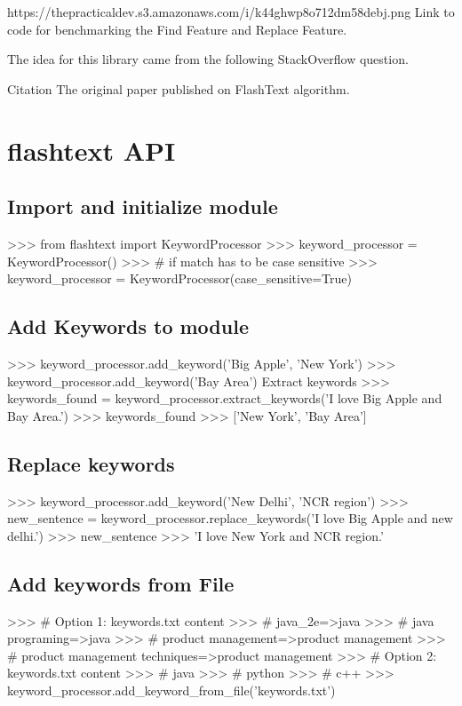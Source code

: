 \documentclass{article}
\begin{document}
https://thepracticaldev.s3.amazonaws.com/i/k44ghwp8o712dm58debj.png
Link to code for benchmarking the Find Feature and Replace Feature.

The idea for this library came from the following StackOverflow question.

Citation
The original paper published on FlashText algorithm.
\section{flashtext API}
\subsection{Import and initialize module}
\begin{ipythoncode}
>>> from flashtext import KeywordProcessor
>>> keyword_processor = KeywordProcessor()
>>> # if match has to be case sensitive
>>> keyword_processor = KeywordProcessor(case_sensitive=True)
\end{ipythoncode}

\subsection{Add Keywords to module}
\begin{ipythoncode}

>>> keyword_processor.add_keyword('Big Apple', 'New York')
>>> keyword_processor.add_keyword('Bay Area')
Extract keywords
>>> keywords_found = keyword_processor.extract_keywords('I love Big Apple and Bay Area.')
>>> keywords_found
>>> ['New York', 'Bay Area']
\end{ipythoncode}

\subsection{Replace keywords}
\begin{ipythoncode}

>>> keyword_processor.add_keyword('New Delhi', 'NCR region')
>>> new_sentence = keyword_processor.replace_keywords('I love Big Apple and new delhi.')
>>> new_sentence
>>> 'I love New York and NCR region.'
\end{ipythoncode}

\subsection{Add keywords from File}
\begin{ipythoncode}

>>> # Option 1: keywords.txt content
>>> # java_2e=>java
>>> # java programing=>java
>>> # product management=>product management
>>> # product management techniques=>product management
>>> # Option 2: keywords.txt content
>>> # java
>>> # python
>>> # c++
>>> keyword_processor.add_keyword_from_file('keywords.txt')
\end{ipythoncode}
\end{document}
